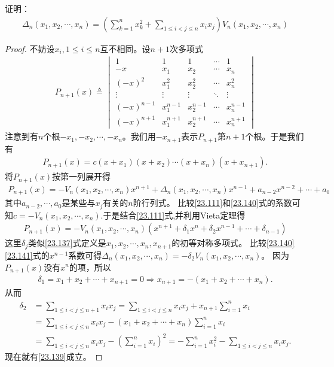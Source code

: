 \documentclass[../../main.tex]{subfiles}%
\begin{document}
\begin{example}
证明：
\begin{align}
\Delta_n(x_1,x_2,\cdots,x_n)=\left(\sum_{k = 1}^n x_k^2+\sum_{1\leqslant  i<j\leqslant  n}x_ix_j\right)V_n(x_1,x_2,\cdots,x_n) \label{23.139}
\end{align} 
\end{example}
\begin{proof}

不妨设\(x_i,1\leqslant  i\leqslant  n\)互不相同。设\(n + 1\)次多项式
\begin{align*}
P_{n + 1}(x)\triangleq\begin{vmatrix}
1&1&1&\cdots&1\\
-x&x_1&x_2&\cdots&x_n\\
(-x)^2&x_1^2&x_2^2&\cdots&x_n^2\\
\vdots&\vdots&\vdots&\ddots&\vdots\\
(-x)^{n - 1}&x_1^{n - 1}&x_2^{n - 1}&\cdots&x_n^{n - 1}\\
(-x)^{n + 1}&x_1^{n + 1}&x_2^{n + 1}&\cdots&x_n^{n + 1}
\end{vmatrix}
\end{align*}
注意到有\(n\)个根\(-x_1,-x_2,\cdots,-x_n\)。我们用\(-x_{n + 1}\)表示\(P_{n + 1}\)第\(n + 1\)个根。于是我们有
\begin{align}
P_{n + 1}(x)=c(x + x_1)(x + x_2)\cdots(x + x_n)(x + x_{n + 1}).\label{23.111}
\end{align}
将\(P_{n + 1}(x)\)按第一列展开得
\begin{align}\label{23.140}
P_{n + 1}(x)=-V_n(x_1,x_2,\cdots,x_n)x^{n + 1}+\Delta_n(x_1,x_2,\cdots,x_n)x^{n - 1}+a_{n - 2}x^{n - 2}+\cdots+a_0
\end{align}
其中\(a_{n - 2},\cdots,a_0\)是某些与\(x_j\)有关的\(n\)阶行列式。
比较\eqref{23.111}和\eqref{23.140}式的系数可知\(c = -V_n(x_1,x_2,\cdots,x_n)\).于是结合\eqref{23.111}式,并利用Vieta定理得
\begin{align}\label{23.141}
P_{n + 1}(x)=-V_n(x_1,x_2,\cdots,x_n)(x^{n + 1}+\delta_1x^n+\delta_2x^{n - 1}+\cdots+\delta_{n - 1})
\end{align}
这里\(\delta_j\)类似\eqref{23.137}式定义是\(x_1,x_2,\cdots,x_n,x_{n + 1}\)的初等对称多项式。
比较\eqref{23.140}\eqref{23.141}式的\(x^{n - 1}\)系数可得\(\Delta_n(x_1,x_2,\cdots,x_n)=-\delta_2V_n(x_1,x_2,\cdots,x_n)\)。
因为\(P_{n + 1}(x)\)没有\(x^n\)的项，所以
\begin{align*}
\delta _1=x_1+x_2+\cdots +x_{n+1}=0\Rightarrow x_{n+1}=-\left( x_1+x_2+\cdots +x_n \right) .
\end{align*}
从而
\begin{align*}
\delta _2&=\sum_{1\leqslant i<j\leqslant n+1}{x_ix_j}=\sum_{1\leqslant i<j\leqslant n}{x_ix_j}+x_{n+1}\sum_{i=1}^n{x_i}
\\
&=\sum_{1\leqslant i<j\leqslant n}{x_ix_j}-\left( x_1+x_2+\cdots +x_n \right) \sum_{i=1}^n{x_i}
\\
&=\sum_{1\leqslant i<j\leqslant n}{x_ix_j}-\left( \sum_{i=1}^n{x_i} \right) ^2=-\sum_{i=1}^n{x_{i}^{2}}-\sum_{1\leqslant i<j\leqslant n}{x_ix_j}.
\end{align*}
现在就有\eqref{23.139}成立。 

\end{proof}
\end{document}
